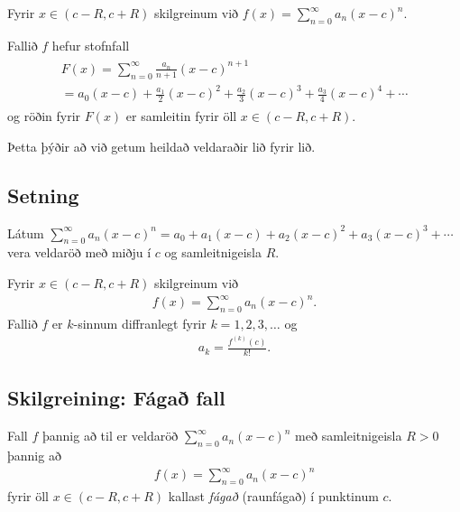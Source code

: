 \documentclass[b5paper,11pt,icelandic]{sphinxmanual}
\begin{document}
Fyrir \(x\in(c-R, c+R)\) skilgreinum við
\(f(x)=\sum_{n=0}^\infty a_n(x-c)^n\).

Fallið \(f\) hefur stofnfall
\begin{equation*}
\begin{split}\begin{gathered}
F(x)=\sum_{n=0}^\infty \frac{a_n}{n+1}(x-c)^{n+1} \\
=a_0(x-c)+\frac{a_1}{2}(x-c)^2+\frac{a_2}{3}(x-c)^3+
\frac{a_3}{4}(x-c)^4+\cdots\end{gathered}\end{split}
\end{equation*}
og röðin fyrir \(F(x)\) er samleitin fyrir öll
\(x\in(c-R, c+R)\).

Þetta þýðir að við getum heildað veldaraðir lið fyrir lið.


\subsection{Setning}
\label{kafli10:id3}
Látum \(\sum_{n=0}^\infty a_n(x-c)^n=a_0+a_1(x-c)+a_2(x-c)^2+a_3(x-c)^3+\cdots\)
vera veldaröð með miðju í \(c\) og samleitnigeisla \(R\).

Fyrir \(x\in(c-R, c+R)\) skilgreinum við
\begin{equation*}
\begin{split}f(x)=\sum_{n=0}^\infty a_n(x-c)^n.\end{split}
\end{equation*}
Fallið \(f\) er \(k\)-sinnum diffranlegt fyrir \(k=1, 2, 3, \ldots\) og
\begin{equation*}
\begin{split}a_k=\frac{f^{(k)}(c)}{k!}.\end{split}
\end{equation*}

\subsection{Skilgreining: Fágað fall}
\label{kafli10:skilgreining-faga-fall}\label{kafli10:index-5}
Fall \(f\) þannig að til er veldaröð
\(\sum_{n=0}^\infty a_n(x-c)^n\) með samleitnigeisla \(R>0\)
þannig að
\begin{equation*}
\begin{split}f(x)=\sum_{n=0}^\infty a_n(x-c)^n\end{split}
\end{equation*}
fyrir öll \(x\in(c-R, c+R)\) kallast \emph{fágað} (raunfágað) í punktinum
\(c\).
\end{document}

